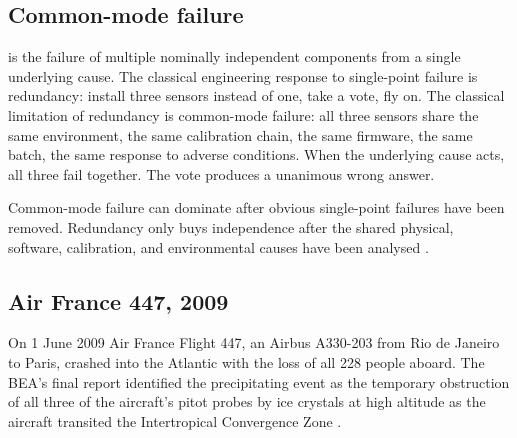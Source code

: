 

\subsection{Common-mode failure}

 is the failure of multiple
nominally independent components from a single underlying cause.
The classical engineering response to single-point failure is
redundancy: install three sensors instead of one, take a vote, fly
on. The classical limitation of redundancy is common-mode failure:
all three sensors share the same environment, the same calibration
chain, the same firmware, the same batch, the same response to
adverse conditions. When the underlying cause acts, all three fail
together. The vote produces a unanimous wrong answer.

Common-mode failure can dominate after obvious single-point failures
have been removed. Redundancy only buys independence after the
shared physical, software, calibration, and environmental causes
have been analysed \cite{text:leveson2011}.

\subsection{Air France 447, 2009}

On 1 June 2009 Air France Flight 447, an Airbus A330-203 from Rio
de Janeiro to Paris, crashed into the Atlantic with the loss of all
228 people aboard. The BEA's final report identified the
precipitating event as the temporary obstruction of all three of
the aircraft's pitot probes by ice crystals at high altitude as the
aircraft transited the Intertropical Convergence Zone
\cite{acc:bea-af447}.

